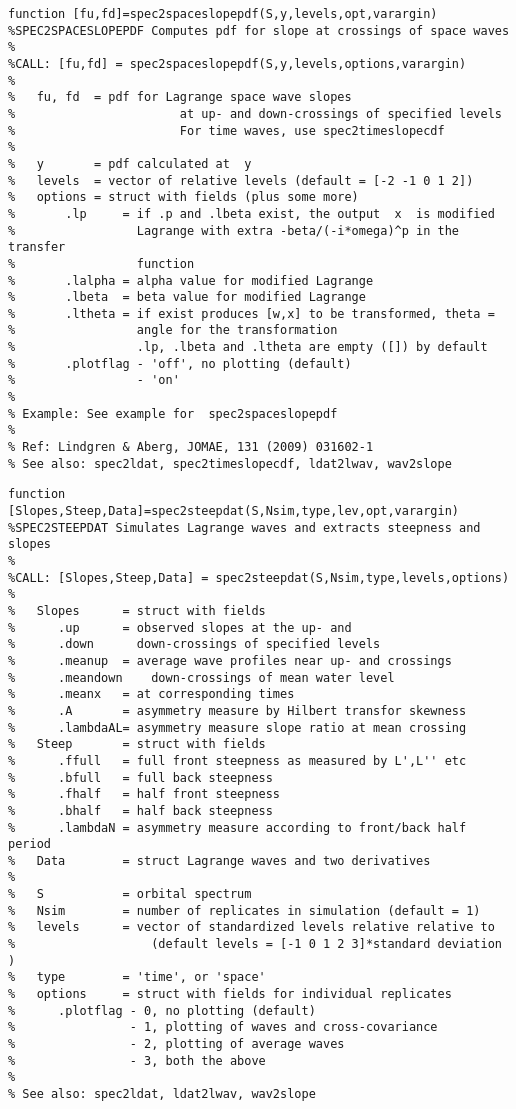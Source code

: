 {\begin{verbatim}
function [fu,fd]=spec2spaceslopepdf(S,y,levels,opt,varargin)
%SPEC2SPACESLOPEPDF Computes pdf for slope at crossings of space waves 
%
%CALL: [fu,fd] = spec2spaceslopepdf(S,y,levels,options,varargin)
%
%   fu, fd  = pdf for Lagrange space wave slopes 
%                       at up- and down-crossings of specified levels
%                       For time waves, use spec2timeslopecdf
%
%   y       = pdf calculated at  y
%   levels  = vector of relative levels (default = [-2 -1 0 1 2])
%   options = struct with fields (plus some more)
%       .lp     = if .p and .lbeta exist, the output  x  is modified 
%                 Lagrange with extra -beta/(-i*omega)^p in the transfer
%                 function
%       .lalpha = alpha value for modified Lagrange
%       .lbeta  = beta value for modified Lagrange
%       .ltheta = if exist produces [w,x] to be transformed, theta = 
%                 angle for the transformation
%                 .lp, .lbeta and .ltheta are empty ([]) by default
%       .plotflag - 'off', no plotting (default)
%                 - 'on' 
%
% Example: See example for  spec2spaceslopepdf
%
% Ref: Lindgren & Aberg, JOMAE, 131 (2009) 031602-1
% See also: spec2ldat, spec2timeslopecdf, ldat2lwav, wav2slope
\end{verbatim}
\clearpage

\begin{verbatim}
function [Slopes,Steep,Data]=spec2steepdat(S,Nsim,type,lev,opt,varargin)
%SPEC2STEEPDAT Simulates Lagrange waves and extracts steepness and slopes
%                
%CALL: [Slopes,Steep,Data] = spec2steepdat(S,Nsim,type,levels,options)
%
%   Slopes      = struct with fields 
%      .up      = observed slopes at the up- and 
%      .down      down-crossings of specified levels                   
%      .meanup  = average wave profiles near up- and crossings
%      .meandown    down-crossings of mean water level
%      .meanx   = at corresponding times
%      .A       = asymmetry measure by Hilbert transfor skewness
%      .lambdaAL= asymmetry measure slope ratio at mean crossing
%   Steep       = struct with fields 
%      .ffull   = full front steepness as measured by L',L'' etc
%      .bfull   = full back steepness
%      .fhalf   = half front steepness
%      .bhalf   = half back steepness
%      .lambdaN = asymmetry measure according to front/back half period 
%   Data        = struct Lagrange waves and two derivatives
%
%   S           = orbital spectrum
%   Nsim        = number of replicates in simulation (default = 1)
%   levels      = vector of standardized levels relative relative to 
%                   (default levels = [-1 0 1 2 3]*standard deviation )
%   type        = 'time', or 'space'
%   options     = struct with fields for individual replicates
%      .plotflag - 0, no plotting (default)
%                - 1, plotting of waves and cross-covariance
%                - 2, plotting of average waves
%                - 3, both the above
%
% See also: spec2ldat, ldat2lwav, wav2slope
\end{verbatim}
\clearpage

}
